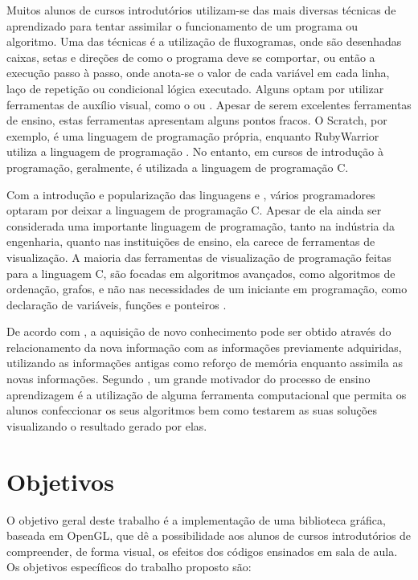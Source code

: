 \documentclass[12pt, %
openright,
oneside, %
a4paper,    %
brazil]{facom-ufu-abntex2}
\begin{document}
Muitos alunos de cursos introdutórios utilizam-se das mais diversas técnicas de aprendizado para tentar assimilar o funcionamento de um programa ou algoritmo. Uma das técnicas é a utilização de fluxogramas, onde são desenhadas caixas, setas e direções de como o programa deve se comportar, ou então a execução passo à passo, onde anota-se o valor de cada variável em cada linha, laço de repetição ou condicional lógica executado. Alguns optam por utilizar ferramentas de auxílio visual, como o  ou . Apesar de serem excelentes ferramentas de ensino, estas ferramentas apresentam alguns pontos fracos. O Scratch, por exemplo, é uma linguagem de programação própria, enquanto RubyWarrior utiliza a linguagem de programação . No entanto, em cursos de introdução à programação, geralmente, é utilizada a linguagem de programação C.

Com a introdução e popularização das linguagens  e , vários programadores optaram por deixar a linguagem de programação C. Apesar de ela ainda ser considerada uma importante linguagem de programação, tanto na indústria da engenharia, quanto nas instituições de ensino, ela carece de ferramentas de visualização. A maioria das ferramentas de visualização de programação feitas para a linguagem C, são focadas em algoritmos avançados, como algoritmos de ordenação, grafos, e não nas necessidades de um iniciante em programação, como declaração de variáveis, funções e ponteiros \cite{kirby2010program}.

De acordo com , a aquisição de novo conhecimento pode ser obtido através do relacionamento da nova informação com as informações previamente adquiridas, utilizando as informações antigas como reforço de memória enquanto assimila as novas informações. Segundo , um grande motivador do processo de ensino aprendizagem é a utilização de alguma ferramenta computacional que permita os alunos confeccionar os seus algoritmos bem como testarem as suas soluções visualizando o resultado gerado por elas.

\section{Objetivos}
O objetivo geral deste trabalho é a implementação de uma biblioteca gráfica, baseada em OpenGL, que dê a possibilidade aos alunos de cursos introdutórios de compreender, de forma visual, os efeitos dos códigos ensinados em sala de aula. Os objetivos específicos do trabalho proposto são:
\end{document}
